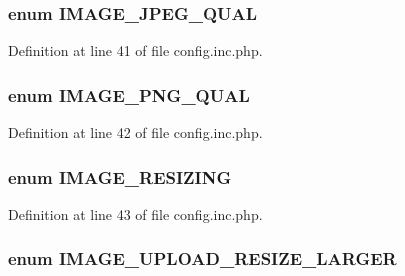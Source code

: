 \hypertarget{config_8inc_8php_af27e0280ef96e9b1d2d968a0d2d208ff}{
\subsubsection[{IMAGE\_\-JPEG\_\-QUAL}]{\setlength{\rightskip}{0pt plus 5cm}enum {\bf IMAGE\_\-JPEG\_\-QUAL}}}
\label{config_8inc_8php_af27e0280ef96e9b1d2d968a0d2d208ff}


Definition at line 41 of file config.inc.php.

\hypertarget{config_8inc_8php_a3e161cc5c717f2e23d89b69ec297af9b}{
\subsubsection[{IMAGE\_\-PNG\_\-QUAL}]{\setlength{\rightskip}{0pt plus 5cm}enum {\bf IMAGE\_\-PNG\_\-QUAL}}}
\label{config_8inc_8php_a3e161cc5c717f2e23d89b69ec297af9b}


Definition at line 42 of file config.inc.php.

\hypertarget{config_8inc_8php_a0654894e46ca07417a6e85e091ed7d1d}{
\subsubsection[{IMAGE\_\-RESIZING}]{\setlength{\rightskip}{0pt plus 5cm}enum {\bf IMAGE\_\-RESIZING}}}
\label{config_8inc_8php_a0654894e46ca07417a6e85e091ed7d1d}


Definition at line 43 of file config.inc.php.

\hypertarget{config_8inc_8php_a009a803b2fcec74eb8fd6b90dfebd680}{
\subsubsection[{IMAGE\_\-UPLOAD\_\-RESIZE\_\-LARGER}]{\setlength{\rightskip}{0pt plus 5cm}enum {\bf IMAGE\_\-UPLOAD\_\-RESIZE\_\-LARGER}}}
\label{config_8inc_8php_a009a803b2fcec74eb8fd6b90dfebd680}



